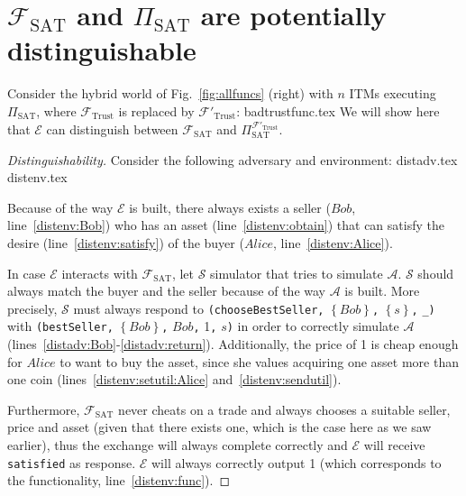 \section{$\mathcal{F}_{\mathrm{SAT}}$ and $\Pi_{\mathrm{SAT}}$ are potentially
distinguishable}
  Consider the hybrid world of Fig.~\ref{fig:allfuncs} (right) with $n$ ITMs executing
  $\Pi_{\mathrm{SAT}}$, where $\mathcal{F}_{\mathrm{Trust}}$ is replaced by
  $\mathcal{F}'_{\mathrm{Trust}}$:
  {badtrustfunc.tex}
  We will show here that $\mathcal{E}$ can distinguish between
  $\mathcal{F}_{\mathrm{SAT}}$ and $\Pi_{\mathrm{SAT}}^{\mathcal{F}'_{\mathrm{Trust}}}$.
  \begin{proof}[Distinguishability]
    Consider the following adversary and environment:
    {distadv.tex}
    {distenv.tex}

    Because of the way $\mathcal{E}$ is built, there always exists a seller ($Bob$,
    line~\ref{distenv:Bob}) who has an asset (line~\ref{distenv:obtain}) that can satisfy
    the desire (line~\ref{distenv:satisfy}) of the buyer ($Alice$,
    line~\ref{distenv:Alice}).

    In case $\mathcal{E}$ interacts with $\mathcal{F}_{\mathrm{SAT}}$, let $\mathcal{S}$
    simulator that tries to simulate $\mathcal{A}$. $\mathcal{S}$ should always match the
    buyer and the seller because of the way $\mathcal{A}$ is built. More precisely,
    $\mathcal{S}$ must always respond to \texttt{(chooseBestSeller,}
    $\left\{Bob\right\}$\texttt{,} $\left\{s\right\}$\texttt{,} \texttt{\_)} with
    \texttt{(bestSeller,} $\left\{Bob\right\}$\texttt{,} $Bob$\texttt{,} 1\texttt{,}
    $s$\texttt{)} in order to correctly simulate $\mathcal{A}$
    (lines~\ref{distadv:Bob}-\ref{distadv:return}). Additionally, the price of 1 is cheap
    enough for $Alice$ to want to buy the asset, since she values acquiring one asset more
    than one coin (lines~\ref{distenv:setutil:Alice} and~\ref{distenv:sendutil}).

    Furthermore, $\mathcal{F}_{\mathrm{SAT}}$ never cheats on a trade and always chooses a
    suitable seller, price and asset (given that there exists one, which is the case here
    as we saw earlier), thus the exchange will always complete correctly and $\mathcal{E}$
    will receive \texttt{satisfied} as response. $\mathcal{E}$ will always correctly
    output 1 (which corresponds to the functionality, line~\ref{distenv:func}).


\end{proof}

